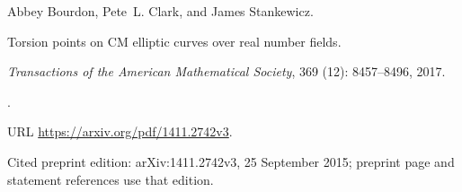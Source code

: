 Abbey Bourdon, Pete~L. Clark, and James Stankewicz.

\newblock Torsion points on {CM} elliptic curves over real number fields.

\newblock \emph{Transactions of the American Mathematical Society},
  369 (12): 8457--8496, 2017.

\newblock {}.

\newblock URL \url{https://arxiv.org/pdf/1411.2742v3}.

\newblock Cited preprint edition: arXiv:1411.2742v3, 25 September 2015; preprint page and statement references use that edition.
